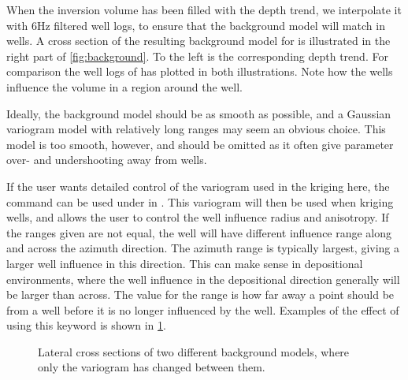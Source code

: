 When the inversion volume has been filled with the depth trend, we
interpolate it with 6Hz filtered well logs, to ensure that the
background model will match in wells. A cross section of the resulting
background model for \vp is illustrated in the right part of
\autoref{fig:background}. To the left is the corresponding depth
trend. For comparison the well logs of \vp has plotted in both
illustrations. Note how the wells influence the volume in a region
around the well.

Ideally, the background model should be as smooth as possible,
and a Gaussian variogram model with relatively long ranges may seem an
obvious choice. This model is too smooth, however, and should be
omitted as it often give parameter over- and undershooting away
from wells.

If the user wants detailed control of the variogram used in the kriging here, the command  can be used under  in . This variogram will then be used when kriging wells, and allows the user to control the well influence radius and anisotropy. If the ranges given are not equal, the well will have different influence range along and across the azimuth direction. The azimuth range is typically largest, giving a larger well influence in this direction. This can make sense in depositional environments, where the well influence in the depositional direction generally will be larger than across. The value for the range is how far away a point should be from a well before it is no longer influenced by the well.  Examples of the effect of using this keyword is shown in \ref{fig:bgvario}.

\begin{figure}
\vspace{1em}
\centering
{}
\caption{Lateral cross sections of two different background models, where only the  variogram has changed between them.}
\label{fig:bgvario}
\end{figure}


